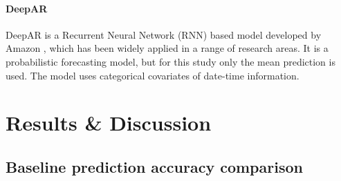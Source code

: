 \paragraph{DeepAR}

DeepAR is a Recurrent Neural Network (RNN) based model developed by Amazon \citep{salinas2020DeepARProbabilisticForecasting}, which has been widely applied in a range of research areas. It is a probabilistic forecasting model, but for this study only the mean prediction is used. The model uses categorical covariates of date-time information.\\


\newpage
\section{Results \& Discussion}



\subsection{Baseline prediction accuracy comparison} \label{sec:forecasting-baseline-comparison}

